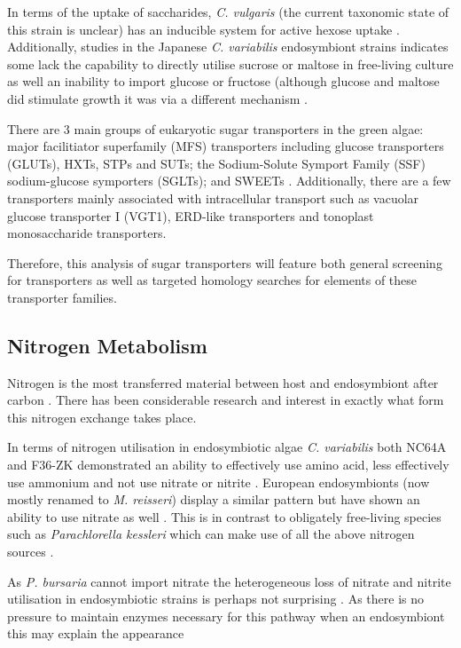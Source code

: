 In terms of the uptake of saccharides, \textit{C. vulgaris} (the current
taxonomic state of this strain is unclear) has an inducible system for active hexose uptake \citep{Tanner1974}.
Additionally, studies in the Japanese \textit{C. variabilis} endosymbiont strains
indicates some lack the capability to directly utilise sucrose or maltose in free-living culture \citep{Kamako2005}
as well an inability to import glucose or fructose \citep{Kato2008a} (although glucose and maltose
did stimulate growth \citep{Kamako2005} it was via a different mechanism \citep{Kato2009}.

There are 3 main groups of eukaryotic sugar transporters in the green algae: 
major facilitiator superfamily (MFS) transporters including glucose
transporters (GLUTs), HXTs, STPs and SUTs; the Sodium-Solute Symport Family (SSF) sodium-glucose symporters (SGLTs); 
and SWEETs \citep{Chen2010a,Chen2015}.
Additionally, there are a few transporters mainly associated with intracellular transport such as 
vacuolar glucose transporter I (VGT1), ERD-like transporters and tonoplast monosaccharide transporters.

Therefore, this analysis of sugar transporters will feature both general screening
for transporters as well as targeted homology searches for elements of these
transporter families.

\subsection{Nitrogen Metabolism}

Nitrogen is the most transferred material between host and endosymbiont
after carbon \citep{Kato2009}.  There has been considerable research and interest
in exactly what form this nitrogen exchange takes place.


In terms of nitrogen utilisation in endosymbiotic algae 
\textit{C. variabilis} both NC64A and F36-ZK demonstrated an ability
to effectively use amino acid, less effectively use ammonium and not
use nitrate or nitrite \citep{Kamako2005,Kato2009}.
European endosymbionts (now mostly renamed to \textit{M. reisseri}) display
a similar pattern but have 
shown an ability to use nitrate as well \citep{Kessler1990}.
This is in contrast to obligately free-living species such as \textit{Parachlorella
kessleri} which can make use of all the above nitrogen sources \citep{Kato2009}.


As \textit{P. bursaria} cannot import nitrate \citep{Albers1982} the heterogeneous
loss of nitrate and nitrite utilisation in endosymbiotic strains is perhaps not surprising \citep{Kato2009}.
As there is no pressure to maintain enzymes necessary for this pathway when an endosymbiont
this may explain the appearance 

